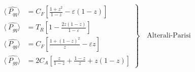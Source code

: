 \begin{equation}
	\left.\begin{aligned}
\langle\:\hat{P_{qq}}\rangle &= C_F[\frac{1+z^2}{1-z}-\varepsilon(1-z)]\\
\langle\:\hat{P_{gq}}\rangle &= T_R[1-\frac{2z(1-z)}{1-\varepsilon}]\\
\langle\:\hat{P_{qg}}\rangle &= C_F[\frac{1+(1-z)^2}{z}-\varepsilon z]\\
\langle\:\hat{P_{gg}}\rangle &= 2C_A[\frac{z}{1-z}+\frac{1-z}{z}+z(1-z)]
\end{aligned}
	\right\}
	\quad \text{Alterali-Parisi
	}
\label{Alterali-Parisi}
\end{equation}
\newpage